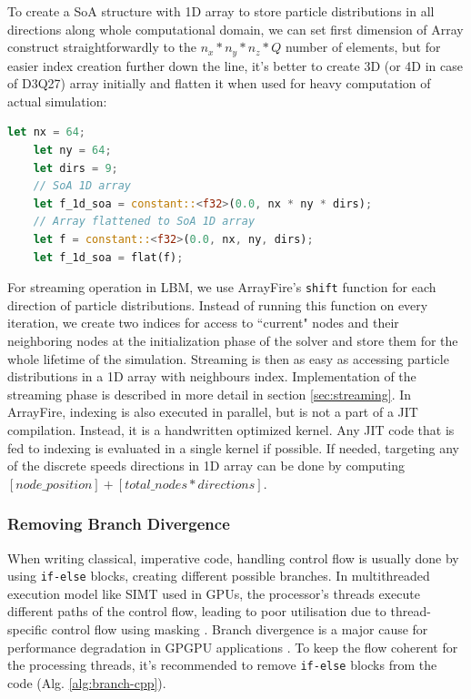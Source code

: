 To create a SoA structure with 1D array to store particle distributions in all directions along whole computational domain, we can set first dimension of Array construct straightforwardly to the $n_x*n_y*n_z*Q$ number of elements, but for easier index creation further down the line, it's better to create 3D (or 4D in case of D3Q27) array initially and flatten it when used for heavy computation of actual simulation:

\begin{lstlisting}[language=Rust, caption=Creating SoA structure representation of D2Q9 lattice with ArrayFire in Rust.]
	let nx = 64;
	let ny = 64;
	let dirs = 9;
	// SoA 1D array
	let f_1d_soa = constant::<f32>(0.0, nx * ny * dirs);
	// Array flattened to SoA 1D array
	let f = constant::<f32>(0.0, nx, ny, dirs);
	let f_1d_soa = flat(f);
\end{lstlisting}

For streaming operation in LBM, we use ArrayFire's \texttt{shift} function for each direction of particle distributions. Instead of running this function on every iteration, we create two indices for access to ``current" nodes and their neighboring nodes at the initialization phase of the solver and store them for the whole lifetime of the simulation. Streaming is then as easy as accessing particle distributions in a 1D array with neighbours index. Implementation of the streaming phase is described in more detail in section \ref{sec:streaming}. In ArrayFire, indexing is also executed in parallel, but is not a part of a JIT compilation. Instead, it is a handwritten optimized kernel. Any JIT code that is fed to indexing is evaluated in a single kernel if possible. If needed, targeting any of the discrete speeds directions in 1D array can be done by computing $[node\_position] + [total\_nodes * directions]$. 

\subsubsection{Removing Branch Divergence}
When writing classical, imperative code, handling control flow is usually done by using \texttt{if-else} blocks, creating different possible branches. In multithreaded execution model like SIMT used in GPUs, the processor's threads execute different paths of the control flow, leading to poor utilisation due to thread-specific control flow using masking \cite{delboscOptimizedImplementationLattice2014}. Branch divergence is a major cause for performance degradation in GPGPU applications \cite{TAN2017649}. To keep the flow coherent for the processing threads, it's recommended to remove \texttt{if-else} blocks from the code (Alg. \ref{alg:branch-cpp}).

